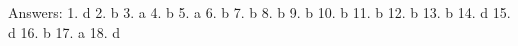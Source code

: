 \documentclass[8pt]{beamer}
\begin{document}
\begin{frame}
\hspace*{-0.5cm}
Answers:
\hspace*{0.2cm} 1. d   \hspace*{0.5cm}  2. b  \hspace*{0.5cm}  3. a   \hspace*{0.5cm}  4. b   \hspace*{0.5cm}  5. a   \hspace*{0.5cm}  6. b  \hspace*{0.5cm}  7. b  \hspace*{0.5cm} 8. b   \hspace*{0.5cm} 9. b
\hspace*{0.5cm} 10. b  \hspace*{0.5cm} 11. b  \hspace*{0.5cm} 12. b   \hspace*{0.5cm} 13. b   \hspace*{0.5cm} 14. d   \hspace*{0.5cm}  15. d   \hspace*{0.5cm} 16. b  \hspace*{0.5cm} 17. a  \hspace*{0.5cm} 18. d\\
\end{frame}
\end{document}
